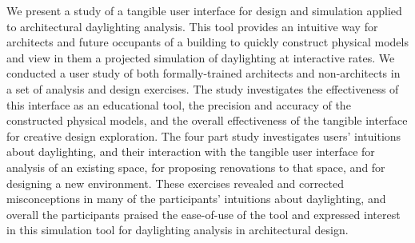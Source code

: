 \documentclass{article}
\begin{document}
\abstract
%
We present a study of a tangible user interface for design and
simulation applied to architectural daylighting analysis.  This tool
provides an intuitive way for architects and future occupants of a
building to quickly construct physical models and 
view 
in them
a projected simulation of daylighting 
at interactive rates.
We conducted a user study of both formally-trained architects and
non-architects in a set of analysis and design exercises.
%
The study investigates the effectiveness of this interface as an
educational tool, the precision and accuracy of the constructed
physical models, and the overall effectiveness of the tangible
interface for creative design exploration.  The four part study
investigates users' intuitions about daylighting, 
and 
their interaction
with the tangible user interface for analysis of an existing space,
for proposing renovations to that space, and for designing a new
environment.
%
These exercises revealed and corrected misconceptions in many of the
participants' intuitions about daylighting, and overall the
participants praised the ease-of-use of the tool and expressed
interest in this simulation tool for daylighting analysis in
architectural design.
%




\end{document}
